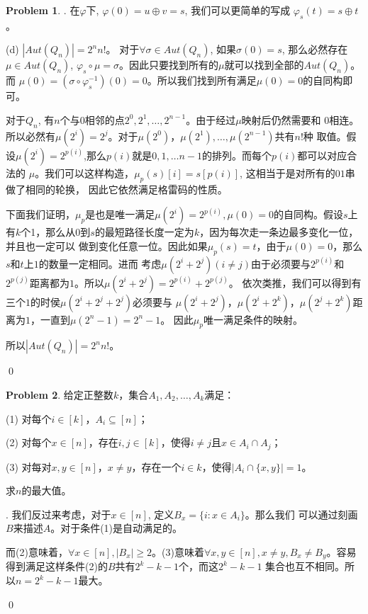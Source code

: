 \documentclass[UTF8]{ctexart}
\newenvironment{sol}
  {\par\vspace{3mm}\indent{\it Solution}.
  \setlength{\parindent}{2em}}
  {\qed \\ \medskip}
\theoremstyle{definition}
\newtheorem{problem}{Problem}
\begin{document}
\begin{problem}
\begin{sol}
    在$\varphi$下, $\varphi(0) = u \oplus v = s$, 我们可以更简单的写成
    $\varphi_s(t) = s \oplus t$。

    \noindent(d) $|Aut(Q_n)|=2^nn!$。
    对于$\forall \sigma \in Aut(Q_n)$, 如果$\sigma(0)=s$, 那么必然存在$\mu \in Aut(Q_n)$,
    $\varphi_s \circ \mu=\sigma$。因此只要找到所有的$\mu$就可以找到全部的$Aut(Q_n)$。而
    $\mu(0)=(\sigma \circ \varphi_s^{-1})(0) = 0$。所以我们找到所有满足$\mu(0)=0$的自同构即可。

    对于$Q_n$, 有$n$个与$0$相邻的点$2^0, 2^1, \dots, 2^{n-1}$。由于经过$\mu$映射后仍然需要和
    $0$相连。所以必然有$\mu(2^i)=2^j$。对于$\mu(2^0)，\mu(2^1),\dots, \mu(2^{n-1})$共有$n!$种
    取值。假设$\mu(2^i)=2^{p(i)}$,那么$p(i)$就是$0,1,\dots n-1$的排列。而每个$p(i)$都可以对应合法的
    $\mu$。我们可以这样构造，$\mu_p(s)[i]=s[p(i)]$, 这相当于是对所有的$01$串做了相同的轮换，
    因此它依然满足格雷码的性质。

    下面我们证明，$\mu_p$是也是唯一满足$\mu(2^i)=2^{p(i)},\mu(0)=0$的自同构。假设$s$上
    有$k$个1，那么从$0$到$s$的最短路径长度一定为$k$，因为每次走一条边最多变化一位，并且也一定可以
    做到变化任意一位。因此如果$\mu_p(s)=t$，由于$\mu(0)=0$，那么$s$和$t$上$1$的数量一定相同。进而
    考虑$\mu(2^i+2^j)(i \not= j)$由于必须要与$2^{p(i)}$和$2^{p(j)}$距离都为$1$。所以$\mu(2^i+2^j)=2^{p(i)}+2^{p(j)}$。
    依次类推，我们可以得到有三个$1$的时侯$\mu(2^i+2^j+2^j)$必须要与
    $\mu(2^i+2^j)$，$\mu(2^i+2^k)$，$\mu(2^j+2^k)$距离为$1$，一直到$\mu(2^n-1)=2^n-1$。
    因此$\mu_p$唯一满足条件的映射。

    所以$|Aut(Q_n)|=2^nn!$。

\end{sol}
\end{problem}

\begin{problem}
给定正整数$k$，集合$A_1, A_2, \dots, A_k$满足：

(1) 对每个$i \in [k]$，$A_i \subseteq [n]$；

(2) 对每个$x \in [n]$，存在$i, j \in [k]$，使得$i \neq j$且$x \in A_i \cap A_j$；

(3) 对每对$x,y \in [n]$，$x \neq y$，存在一个$i \in k$，使得$|A_i \cap \{x, y\}| = 1$。

求$n$的最大值。
\begin{sol}
    我们反过来考虑，对于$x\in [n]$, 定义$B_x=\{ i : x \in A_i \}$。那么我们
    可以通过刻画$B$来描述$A$。对于条件(1)是自动满足的。

    而(2)意味着，$\forall x \in [n], |B_x| \geq 2$。(3)意味着$\forall x, y \in [n],
    x \not= y, B_x \not= B_y$。容易得到满足这样条件(2)的$B$共有$2^k-k-1$个，而这$2^k-k-1$
    集合也互不相同。所以$n=2^k-k-1$最大。
    
\end{sol}
\end{problem}
\end{document}
